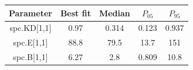 \begin{tabular}{ccccc}
\toprule
Parameter & Best fit & Median & $P_{05}$ & $P_{95}$\\
\midrule
spc.KD[1,1] & 0.97 & 0.314 & 0.123 & 0.937\\
spc.E[1,1] & 88.8 & 79.5 & 13.7 & 151\\
spc.B[1,1] & 6.27 & 2.8 & 0.809 & 10.8\\
\bottomrule
\end{tabular}
